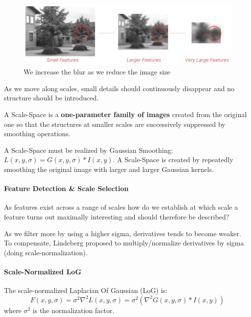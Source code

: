 \begin{figure}[htbp]
  \centering
  \includegraphics[width=0.9\linewidth]{./img/scale_space.jpg}
  \caption{We increase the blur as we reduce the image size}
  \label{fig:scale_space}
\end{figure}

As we move along scales, small details should continuously disappear and no structure should be introduced.

A Scale-Space is a \textbf{one-parameter family of images} created from the original one so that the structures at smaller scales are successively suppressed by smoothing operations.

A Scale-Space must be realized by Gaussian Smoothing: $L(x,y,\sigma) = G(x,y,\sigma) * I(x,y)$.
A Scale-Space is created by repeatedly smoothing the original image with larger and larger Gaussian kernels.

\paragraph{Feature Detection \& Scale Selection}
As features exist across a range of scales how do we establish at which scale a feature turns out maximally interesting and should therefore be described?


As we filter more by using a higher sigma, derivatives tends to become weaker.
To compensate, Lindeberg proposed to multiply/normalize derivatives by sigma (doing scale-normalization).

\paragraph{Scale-Normalized LoG}

The scale-normalized Laplacian Of Gaussian (LoG) is: 
$$F(x,y,\sigma) = \sigma^2\nabla^2 L(x,y,\sigma) = \sigma^2(\nabla^2 G(x,y,\sigma) * I(x,y))$$ where $\sigma^2$ is the normalization factor.

